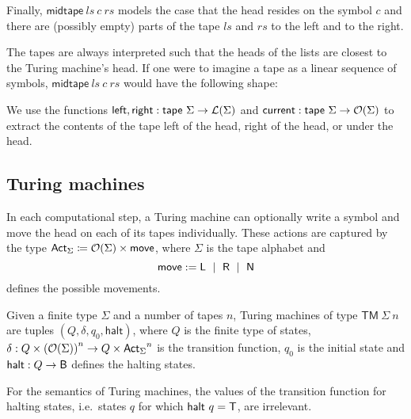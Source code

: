 Finally, $\textsf{midtape}~ls~c~rs$ models the case that the head resides on the symbol $c$ and there are (possibly empty) parts of the tape $ls$ and $rs$ to the left and to the right.

The tapes are always interpreted such that the heads of the lists are closest to the Turing machine's head. If one were to imagine a tape as a linear sequence of symbols, $\textsf{midtape}~ls~c~rs$ would have the following shape: 
\begin{center}
\end{center}

We use the functions $\textsf{left}, \textsf{right} : \textsf{tape}~\Sigma \rightarrow \mathcal{L} (\Sigma)$ and $\textsf{current} : \textsf{tape}~\Sigma \rightarrow \mathcal{O}{(\Sigma)}$ to extract the contents of the tape left of the head, right of the head, or under the head. 

\subsection{Turing machines}
In each computational step, a Turing machine can optionally write a symbol and move the head on each of its tapes individually. These actions are captured by the type $\textsf{Act}_{\Sigma} \coloneqq{} \mathcal{O}{(\Sigma)} \times \textsf{move}$, where $\Sigma$ is the tape alphabet and 
\[\textsf{move} := \textsf{L} ~\mid~ \textsf{R} ~\mid~ \textsf{N} \] 
defines the possible movements. 

\begin{definition}
  Given a finite type $\Sigma$ and a number of tapes $n$, Turing machines of type $\textsf{TM}~\Sigma~n$ are tuples $(Q, \delta, q_0, \textsf{halt})$, where $Q$ is the finite type of states, $\delta : Q \times {(\mathcal{O}{(\Sigma)})}^n \rightarrow Q \times {\textsf{Act}_\Sigma}^n$ is the transition function, $q_0$ is the initial state and $\textsf{halt} : Q \rightarrow \textsf{B}$ defines the halting states.
\end{definition}
For the semantics of Turing machines, the values of the transition function for halting states, i.e.\ states $q$ for which $\textsf{halt}~q = \mathsf{T}$, are irrelevant. 

